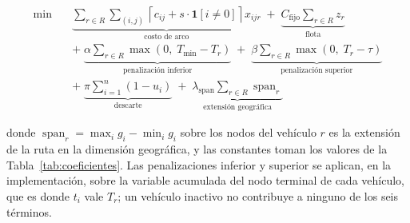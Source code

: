 \begin{enumerate}
\begin{equation}
  \begin{aligned}
    \min \quad
      &\underbrace{\sum_{r \in R} \sum_{(i,j)}
        \left\lceil c_{ij} + s\cdot\mathbf{1}[i \neq 0] \right\rceil x_{ijr}}_{\text{costo de arco}}
      \;+\; \underbrace{C_{\text{fijo}} \sum_{r \in R} z_r}_{\text{flota}} \\[2pt]
      &+\; \underbrace{\alpha \sum_{r \in R}
        \max\!\left(0,\; T_{\min} - T_r\right)}_{\text{penalización inferior}}
      \;+\; \underbrace{\beta \sum_{r \in R}
        \max\!\left(0,\; T_r - \tau\right)}_{\text{penalización superior}} \\[2pt]
      &+\; \underbrace{\pi \sum_{i=1}^{n} \left(1 - u_i\right)}_{\text{descarte}}
      \;+\; \underbrace{\lambda_{\text{span}} \sum_{r \in R}
        \operatorname{span}_r}_{\text{extensión geográfica}}
  \end{aligned}
  \label{eq:objetivo}
\end{equation}

donde $\operatorname{span}_r = \max_i g_i - \min_i g_i$ sobre los nodos del vehículo $r$ es la
extensión de la ruta en la dimensión geográfica, y las constantes toman los valores de la
Tabla~\ref{tab:coeficientes}. Las penalizaciones inferior y superior se aplican, en la
implementación, sobre la variable acumulada del nodo terminal de cada vehículo, que es donde $t_i$
vale $T_r$; un vehículo inactivo no contribuye a ninguno de los seis términos.


\end{enumerate}

